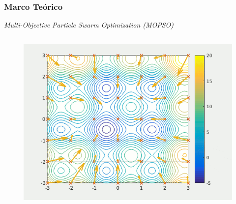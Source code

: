 \documentclass[usenames,dvipsnames]{beamer}
\begin{document}
\begin{frame}
\frametitle{Marco Teórico} 
\begin{exampleblock}{\textit{Multi-Objective Particle Swarm Optimization (MOPSO)}}

\end{exampleblock}
\vspace{-0.5cm}
\begin{columns}[t]
\begin{column}{.45\textwidth}
\begin{figure}[H]
\centering
    
    \includegraphics[width=\textwidth]{./graphics/ejemplopso/capas-0.png}
    

\end{figure}
\end{column}
\end{columns}
\end{frame}
\end{document}
